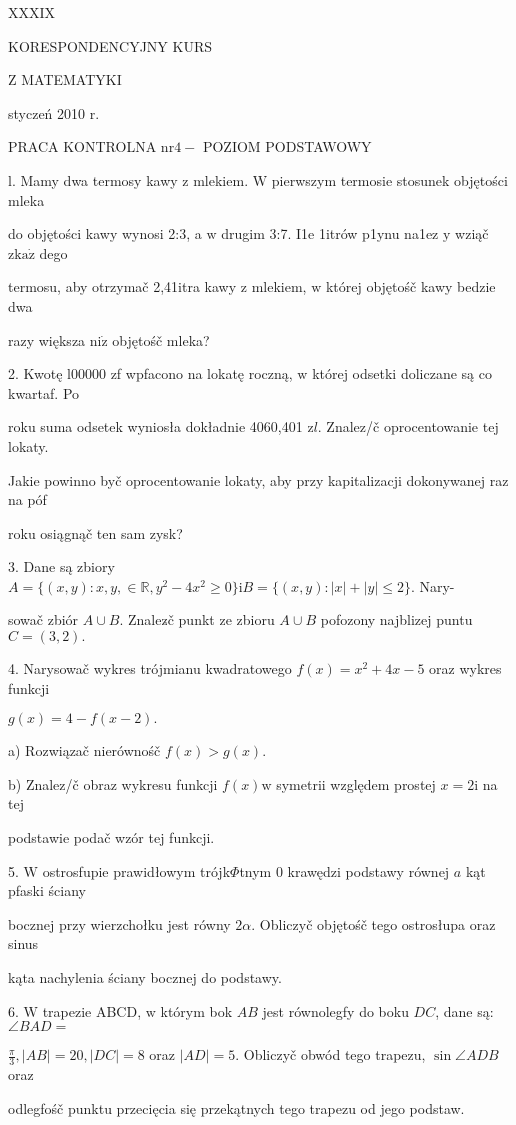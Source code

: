 \documentclass[a4paper,12pt]{article}
\begin{document}
XXXIX

KORESPONDENCYJNY KURS

Z MATEMATYKI

styczeń 2010 r.

PRACA KONTROLNA $\mathrm{n}\mathrm{r} 4-$ POZIOM PODSTAWOWY

l. Mamy dwa termosy kawy $\mathrm{z}$ mlekiem. $\mathrm{W}$ pierwszym termosie stosunek objętości mleka

do objętości kawy wynosi 2:3, a $\mathrm{w}$ drugim 3:7. I1e 1itrów p1ynu na1ez $\mathrm{y}$ wziąč $\mathrm{z}\mathrm{k}\mathrm{a}\dot{\mathrm{z}}$ dego

termosu, aby otrzymač 2,41itra kawy $\mathrm{z}$ mlekiem, $\mathrm{w}$ której objętośč kawy bedzie dwa

razy większa $\mathrm{n}\mathrm{i}\dot{\mathrm{z}}$ objętośč mleka?

2. Kwotę l00000 zf wpfacono na lokatę roczną, $\mathrm{w}$ której odsetki doliczane są co kwartaf. Po

roku suma odsetek wyniosła dokładnie 4060,401 $\mathrm{z}l$. Znalez/č oprocentowanie tej lokaty.

Jakie powinno byč oprocentowanie lokaty, aby przy kapitalizacji dokonywanej raz na póf

roku osiągnąč ten sam zysk?

3. Dane są zbiory $A=\{(x,y):x,y,\in \mathbb{R},y^{2}-4x^{2}\geq 0\}\mathrm{i}B=\{(x,y):|x|+|y|\leq 2\}$. Nary-

sowač zbiór $A\cup B$. Znalez$\acute{}$č punkt ze zbioru $A\cup B$ pofozony najblizej puntu $C=(3,2).$

4. Narysowač wykres trójmianu kwadratowego $f(x) = x^{2}+4x-5$ oraz wykres funkcji

$g(x)=4-f(x-2).$

a) Rozwiązač nierównośč $f(x)>g(x).$

b) Znalez/č obraz wykresu funkcji $f(x) \mathrm{w}$ symetrii względem prostej $x=2 \mathrm{i}$ na tej

podstawie podač wzór tej funkcji.

5. $\mathrm{W}$ ostrosfupie prawidłowym trójk$\Phi$tnym $0$ krawędzi podstawy równej $a$ kąt pfaski ściany

bocznej przy wierzchołku jest równy $ 2\alpha$. Obliczyč objętośč tego ostrosłupa oraz sinus

kąta nachylenia ściany bocznej do podstawy.

6. $\mathrm{W}$ trapezie ABCD, $\mathrm{w}$ którym bok $AB$ jest równolegfy do boku $DC$, dane są: $\angle BAD=$

$\displaystyle \frac{\pi}{3}, |AB| =20, |DC| =8$ oraz $|AD| =5$. Obliczyč obwód tego trapezu, $\sin\angle ADB$ oraz

odlegfośč punktu przecięcia się przekątnych tego trapezu od jego podstaw.
\end{document}
